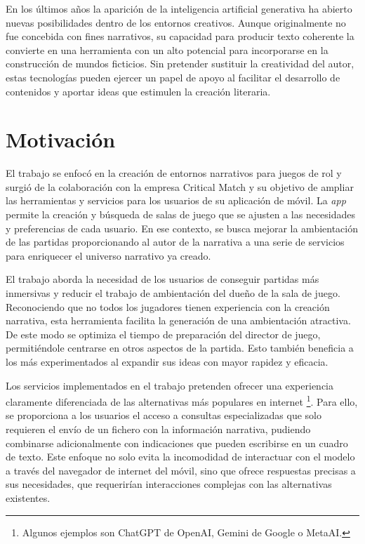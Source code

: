 En los últimos años la aparición de la inteligencia artificial generativa ha abierto nuevas posibilidades
dentro de los entornos creativos.
Aunque originalmente no fue concebida con fines narrativos, su capacidad para producir texto coherente
la convierte en una herramienta con un alto potencial para incorporarse en la construcción de mundos ficticios.
Sin pretender sustituir la creatividad del autor, estas tecnologías pueden ejercer un papel de apoyo
al facilitar el desarrollo de contenidos y aportar ideas que estimulen la creación literaria.


\section{Motivación}
El trabajo se enfocó en la creación de entornos narrativos para juegos de rol 
y surgió de la colaboración con la empresa Critical Match\cite{crit_match_web} y su objetivo de ampliar las herramientas 
y servicios para los usuarios de su aplicación de móvil.
La \textit{app}\cite{crit_match_app} permite la creación y búsqueda de salas de juego que se ajusten a las necesidades y preferencias de cada usuario.
En ese contexto, se busca mejorar la ambientación de las partidas proporcionando al autor de la narrativa a una serie de servicios
para enriquecer el universo narrativo ya creado.

El trabajo aborda la necesidad de los usuarios de conseguir partidas más inmersivas
y reducir el trabajo de ambientación del dueño de la sala de juego.
Reconociendo que no todos los jugadores tienen experiencia con la creación narrativa,
esta herramienta facilita la generación de una ambientación atractiva.
De este modo se optimiza el tiempo de preparación del director de juego, permitiéndole centrarse en otros aspectos de la partida.
Esto también beneficia a los más experimentados al expandir sus ideas con mayor rapidez y eficacia.

Los servicios implementados en el trabajo pretenden ofrecer una experiencia claramente diferenciada de las alternativas más populares en internet
\footnote{Algunos ejemplos son ChatGPT de OpenAI, Gemini de Google o MetaAI.}.
Para ello, se proporciona a los usuarios el acceso a consultas especializadas que solo requieren el envío de un fichero
con la información narrativa, pudiendo combinarse adicionalmente con indicaciones que pueden escribirse en un cuadro de texto.
Este enfoque no solo evita la incomodidad de interactuar con el modelo a través del navegador de internet del móvil,
sino que ofrece respuestas precisas a sus necesidades, que requerirían interacciones complejas
con las alternativas existentes.

